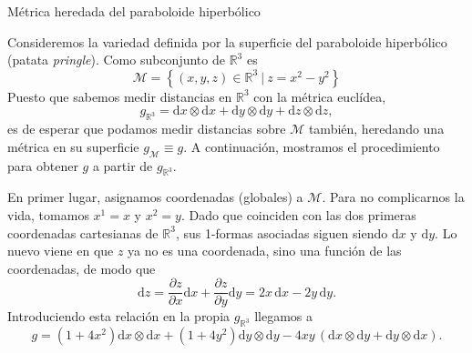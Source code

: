 \begin{example}
    {Métrica heredada del paraboloide hiperbólico
    \label{ej.3-metrica_paraboloide}}

    Consideremos la variedad definida por la superficie del paraboloide hiperbólico (patata \textit{pringle}). Como subconjunto de \(\mathbb{R}^3\) es
    \begin{equation*}
        \mathcal{M} = \left\{(x, y, z)\in\mathbb{R}^3\ |\ z = x^2 - y^2\right\}
    \end{equation*}
    Puesto que sabemos medir distancias en \(\mathbb{R}^3\) con la métrica euclídea,
    \begin{equation*}
        g_{\mathbb{R}^3} = \mathrm{d}x\otimes\mathrm{d}x+\mathrm{d}y\otimes\mathrm{d}y+\mathrm{d}z\otimes\mathrm{d}z,
    \end{equation*}
    es de esperar que podamos medir distancias sobre \(\mathcal{M}\) también, heredando una métrica en su superficie \(g_\mathcal{M}\equiv g\). A continuación, mostramos el procedimiento para obtener \(g\) a partir de \(g_{\mathbb{R}^3}\). 

    En primer lugar, asignamos coordenadas (globales) a \(\mathcal{M}\). Para no complicarnos la vida, tomamos \(x^1=x\) y \(x^2=y\). Dado que coinciden con las dos primeras coordenadas cartesianas de \(\mathbb{R}^3\), sus 1-formas asociadas siguen siendo \(\mathrm{d}x\) y \(\mathrm{d}y\). Lo nuevo viene en que \(z\) ya no es una coordenada, sino una función de las coordenadas, de modo que 
    \begin{equation*}
        \mathrm{d}z = \frac{\partial z}{\partial x}\mathrm{d}x + \frac{\partial z}{\partial y}\mathrm{d}y = 2x\,\mathrm{d}x - 2y\, \mathrm{d}y.
    \end{equation*}
    Introduciendo esta relación en la propia \(g_{\mathbb{R}^3}\) llegamos a  
    \begin{equation*}
        g = 
        \left(1+4x^2\right)\mathrm{d}x\otimes\mathrm{d}x +
        \left(1+4y^2\right)\mathrm{d}y\otimes\mathrm{d}y - 
        4xy\,(\mathrm{d}x\otimes\mathrm{d}y + \mathrm{d}y\otimes\mathrm{d}x).
    \end{equation*}


\end{example}

